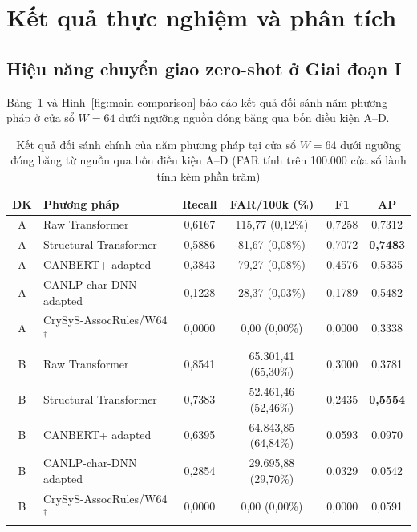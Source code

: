 \documentclass[12pt, a4paper, reqno, oneside]{book}
\begin{document}
\section{Kết quả thực nghiệm và phân tích}\label{sec:exp-results}

\subsection{Hiệu năng chuyển giao zero-shot ở Giai đoạn I}\label{subsec:eval-stage1}

Bảng~\ref{tab:main-comparison} và Hình~\ref{fig:main-comparison} báo cáo kết quả đối sánh năm phương pháp ở cửa sổ $W=64$ dưới ngưỡng nguồn đóng băng qua bốn điều kiện A--D.

\begin{table}[htbp]
  \centering
  \caption[Kết quả đối sánh chính năm phương pháp tại $W=64$ dưới ngưỡng nguồn]{Kết quả đối sánh chính của năm phương pháp tại cửa sổ $W=64$ dưới ngưỡng đóng băng từ nguồn qua bốn điều kiện A--D (FAR tính trên 100.000 cửa sổ lành tính kèm phần trăm)}
  \label{tab:main-comparison}
  \footnotesize
  \begin{tabular}{@{}c l c c c c@{}}
    \toprule
    \textbf{ĐK} & \textbf{Phương pháp} & \textbf{Recall} & \textbf{FAR/100k (\%)} & \textbf{F1} & \textbf{AP} \\
    \midrule
    A & Raw Transformer & 0,6167 & 115,77 (0,12\%) & 0,7258 & 0,7312 \\
    A & Structural Transformer & 0,5886 & 81,67 (0,08\%) & 0,7072 & \textbf{0,7483} \\
    A & CANBERT+ adapted & 0,3843 & 79,27 (0,08\%) & 0,4576 & 0,5335 \\
    A & CANLP-char-DNN adapted & 0,1228 & 28,37 (0,03\%) & 0,1789 & 0,5482 \\
    A & CrySyS-AssocRules/W64$^\dagger$ & 0,0000 & 0,00 (0,00\%) & 0,0000 & 0,3338 \\
    \midrule
    B & Raw Transformer & 0,8541 & 65.301,41 (65,30\%) & 0,3000 & 0,3781 \\
    B & Structural Transformer & 0,7383 & 52.461,46 (52,46\%) & 0,2435 & \textbf{0,5554} \\
    B & CANBERT+ adapted & 0,6395 & 64.843,85 (64,84\%) & 0,0593 & 0,0970 \\
    B & CANLP-char-DNN adapted & 0,2854 & 29.695,88 (29,70\%) & 0,0329 & 0,0542 \\
    B & CrySyS-AssocRules/W64$^\dagger$ & 0,0000 & 0,00 (0,00\%) & 0,0000 & 0,0591 \\

\end{tabular}
\end{table}
\end{document}
